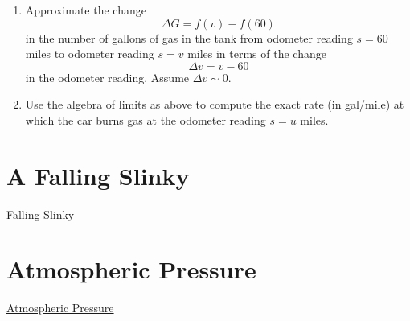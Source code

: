 \documentclass{ximera}
\begin{document}
\begin{example}
\begin{enumerate}
\item Approximate the change 
\[
  \Delta G = f(v) - f(60)
\]
in the number of gallons of gas in the tank from odometer reading $s=60$ miles to odometer reading $s=v$ miles in terms of the change
\[
     \Delta v = v - 60
\] 
in the odometer reading. Assume $\Delta v \sim 0$.

\item Use the algebra of limits as above to compute the exact rate (in gal/mile) at which the car burns gas at the odometer reading $s=u$ miles.

\end{enumerate}

\end{example}


\section{A Falling Slinky}

\href{https://www.youtube.com/watch?v=eCMmmEEyOO0}{Falling Slinky}


\section{Atmospheric Pressure}

\href{https://projects.iq.harvard.edu/files/acmg/files/intro_atmo_chem_bookchap2.pdf}{Atmospheric Pressure} 
\end{document}
